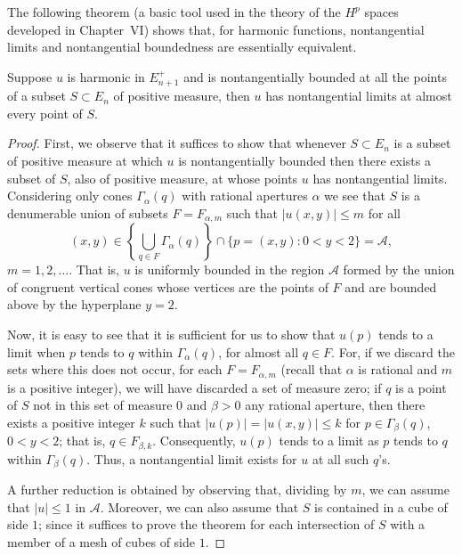 The following theorem (a basic tool used in the theory of the $H^p$ spaces developed in Chapter~VI) shows that, for harmonic functions, nontangential limits and nontangential boundedness are essentially equivalent.

\begin{theorem}\label{thm:c2-3-19}
Suppose $u$ is harmonic in $E_{n+1}^+$ and is nontangentially bounded at all the points of a subset $S \subset E_n$ of positive measure, then $u$ has nontangential limits at almost every point of $S$.
\end{theorem}

\begin{proof}
First, we observe that it suffices to show that whenever $S \subset E_n$ is a subset of positive measure at which $u$ is nontangentially bounded then there exists a subset of $S$, also of positive measure, at whose points $u$ has nontangential limits. Considering only cones $\Gamma_\alpha(q)$ with rational apertures $\alpha$ we see that $S$ is a denumerable union of subsets $F = F_{\alpha,m}$ such that $|u(x, y)| \leq m$ for all
\[
(x, y) \in \left\{\bigcup_{q \in F} \Gamma_\alpha(q)\right\} \cap \{p = (x, y) : 0 < y < 2\} = \mathcal{A},
\]
$m = 1, 2, \dots$. That is, $u$ is uniformly bounded in the region $\mathcal{A}$ formed by the union of congruent vertical cones whose vertices are the points of $F$ and are bounded above by the hyperplane $y = 2$.

Now, it is easy to see that it is sufficient for us to show that $u(p)$ tends to a limit when $p$ tends to $q$ within $\Gamma_\alpha(q)$, for almost all $q \in F$. For, if we discard the sets where this does not occur, for each $F = F_{\alpha,m}$ (recall that $\alpha$ is rational and $m$ is a positive integer), we will have discarded a set of measure zero; if $q$ is a point of $S$ not in this set of measure $0$ and $\beta > 0$ any rational aperture, then there exists a positive integer $k$ such that $|u(p)| = |u(x, y)| \leq k$ for $p \in \Gamma_\beta(q)$, $0 < y < 2$; that is, $q \in F_{\beta,k}$. Consequently, $u(p)$ tends to a limit as $p$ tends to $q$ within $\Gamma_\beta(q)$. Thus, a nontangential limit exists for $u$ at all such $q$'s.

A further reduction is obtained by observing that, dividing by $m$, we can assume that $|u| \leq 1$ in $\mathcal{A}$. Moreover, we can also assume that $S$ is contained in a cube of side $1$; since it suffices to prove the theorem for each intersection of $S$ with a member of a mesh of cubes of side $1$.


\end{proof}
